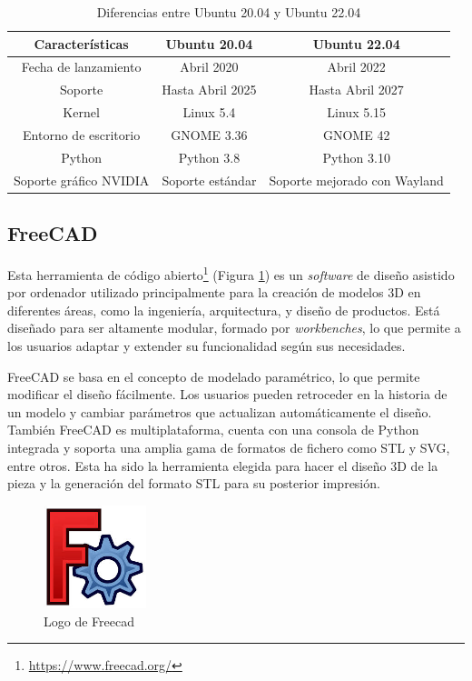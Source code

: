 \begin{table}[H]
	\begin{center}
		\begin{tabular}{|c|c|c|}
			\hline
			\textbf{Características} & \textbf{Ubuntu 20.04} & \textbf{Ubuntu 22.04} \\
			\hline
			Fecha de lanzamiento & Abril 2020 & Abril 2022\\
			\hline
			Soporte & Hasta Abril 2025 & Hasta Abril 2027\\
			\hline
			Kernel & Linux 5.4 & Linux 5.15 \\
			\hline
			Entorno de escritorio & GNOME 3.36 & GNOME 42\\
			\hline
			Python & Python 3.8 & Python 3.10\\
			\hline
			Soporte gráfico NVIDIA & Soporte estándar & Soporte mejorado con Wayland\\
			\hline
		\end{tabular}
		\caption{Diferencias entre Ubuntu 20.04 y Ubuntu 22.04}
		\label{cuadro:ubuntu}
	\end{center}
\end{table}

\subsection{FreeCAD}
\label{subsec:freecad}

Esta herramienta de código abierto\footnote{\url{https://www.freecad.org/}} (Figura \ref{fig:freecad}) es un \textit{software} de diseño asistido por ordenador utilizado principalmente para la creación de modelos 3D en diferentes áreas, como la ingeniería, arquitectura, y diseño de productos. Está diseñado para ser altamente modular, formado por \textit{workbenches}, lo que permite a los usuarios adaptar y extender su funcionalidad según sus necesidades.

FreeCAD se basa en el concepto de modelado paramétrico, lo que permite modificar el diseño fácilmente. Los usuarios pueden retroceder en la historia de un modelo y cambiar parámetros que actualizan automáticamente el diseño. También FreeCAD es multiplataforma, cuenta con una consola de Python integrada y soporta una amplia gama de formatos de fichero como STL y SVG, entre otros. Esta ha sido la herramienta elegida para hacer el diseño 3D de la pieza y la generación del formato STL para su posterior impresión. 

\begin{figure} [h!]
	\begin{center}
		\includegraphics[width=3cm]{figs/freecad.png}
	\end{center}
	\caption{Logo de Freecad} 
	\label{fig:freecad}
\end{figure}


